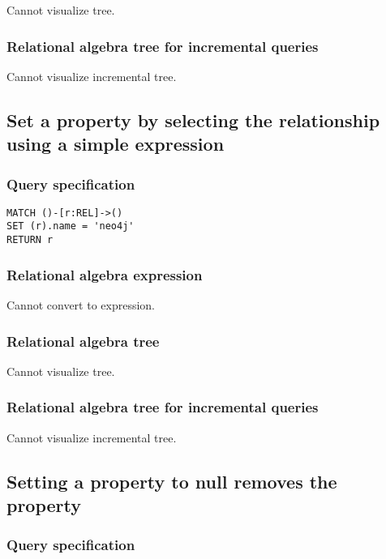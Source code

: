 Cannot visualize tree.

\subsubsection*{Relational algebra tree for incremental queries}

Cannot visualize incremental tree.

\subsection{Set a property by selecting the relationship using a simple expression}

\subsubsection*{Query specification}

\begin{lstlisting}
MATCH ()-[r:REL]->()
SET (r).name = 'neo4j'
RETURN r
\end{lstlisting}

\subsubsection*{Relational algebra expression}

Cannot convert to expression.

\subsubsection*{Relational algebra tree}

Cannot visualize tree.

\subsubsection*{Relational algebra tree for incremental queries}

Cannot visualize incremental tree.

\subsection{Setting a property to null removes the property}

\subsubsection*{Query specification}

